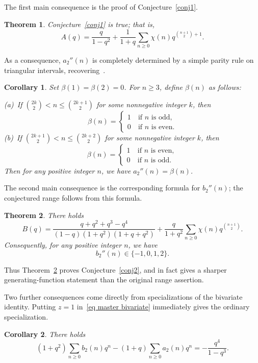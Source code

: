 \documentclass[reqno]{amsart}
\theoremstyle{definition}
\theoremstyle{plain}
\newtheorem{theorem}    {Theorem}
\newtheorem{corollary}  {Corollary}
\theoremstyle{remark}
\numberwithin{equation}{section}
\newcommand{\fr}{\frac}
\begin{document}
The first main consequence is the proof of Conjecture~\ref{conj1}.
\begin{theorem}\label{thm main-1}
Conjecture~\ref{conj1} is true; that is,
\[
A(q)=\fr{q}{1-q^2}+\fr{1}{1+q}\sum_{n\geq 0} \chi(n) q^{\binom{n+1}{2}+1}.
\]
\end{theorem}
As a consequence, $a_2''(n)$ is completely determined by a simple parity rule on triangular intervals, recovering~\cite[Proposition 1]{Andrews-Bachraoui conjectures}.
\begin{corollary}\label{cor a2-0,1}
Set $\beta(1)=\beta(2)=0$.  For $n\geq 3$, define $\beta(n)$ as follows:

(a)\ If $\binom{2k}{2} < n\leq \binom{2k+1}{2}$ for some nonnegative integer $k$, then
\[
\beta(n)
=\begin{cases}
1 &\ \text{if $n$ is odd}, \\
0 &\ \text{if $n$ is even}.
\end{cases}
\]
(b)\ If $\binom{2k+1}{2} < n\leq \binom{2k+2}{2}$ for some nonnegative integer $k$, then
\[
\beta(n)
=\begin{cases}
1 &\ \text{if $n$ is even}, \\
0 &\ \text{if $n$ is odd}.
\end{cases}
\]
Then for any positive integer $n$, we have $a_2''(n)=\beta(n)$.
\end{corollary}

The second main consequence is the corresponding formula for $b_2''(n)$; the conjectured range follows from this formula.
\begin{theorem}\label{thm main-2}
There holds
\begin{equation}\label{conj2-id}
B(q)
=\fr{q+q^2+q^3-q^4}{(1-q)(1+q^2)(1+q+q^2)}+\fr{q}{1+q^2}\sum_{n\geq 0} \chi(n) q^{\binom{n+1}{2}}.
\end{equation}
Consequently, for any positive integer $n$, we have
\[
b_2''(n)\in\{-1,0,1,2\}.
\]
\end{theorem}
Thus Theorem~\ref{thm main-2} proves Conjecture~\ref{conj2}, and in fact gives a sharper generating-function statement than the original range assertion.

Two further consequences come directly from specializations of the bivariate identity.
Putting $z=1$ in~\eqref{eq master bivariate} immediately gives the ordinary specialization.
\begin{corollary}\label{cor ordinary relation}
There holds
\begin{equation}\label{eq ordinary relation}
(1+q^2)\sum_{n\ge 0} b_2(n)q^n-(1+q)\sum_{n\ge 0} a_2(n)q^n=-\frac{q^4}{1-q^3}.
\end{equation}
\end{corollary}
\end{document}
